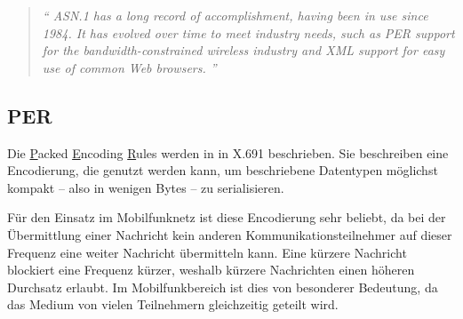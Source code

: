 \cite{asn:itu:asn.1}
\begin{quotation}
	\textit{\enquote{
		ASN.1 has a long record of accomplishment, having been in use since 1984. It has evolved over time to meet industry needs, such as PER support for the bandwidth-constrained wireless industry and XML support for easy use of common Web browsers.
	}}
	\cite{asn:itu:asn.1}
\end{quotation}

\subsection{PER}

Die \underline{P}acked \underline{E}ncoding \underline{R}ules werden in in X.691 \cite{asn:itu:x691} beschrieben.
Sie beschreiben eine Encodierung, die genutzt werden kann, um beschriebene Datentypen möglichst kompakt -- also in wenigen Bytes -- zu serialisieren.

Für den Einsatz im Mobilfunknetz ist diese Encodierung sehr beliebt, da bei der Übermittlung einer Nachricht kein anderen Kommunikationsteilnehmer auf dieser Frequenz eine weiter Nachricht übermitteln kann.
Eine kürzere Nachricht blockiert eine Frequenz kürzer, weshalb kürzere Nachrichten einen höheren Durchsatz erlaubt.
Im Mobilfunkbereich ist dies von besonderer Bedeutung, da das Medium von vielen Teilnehmern gleichzeitig geteilt wird. 